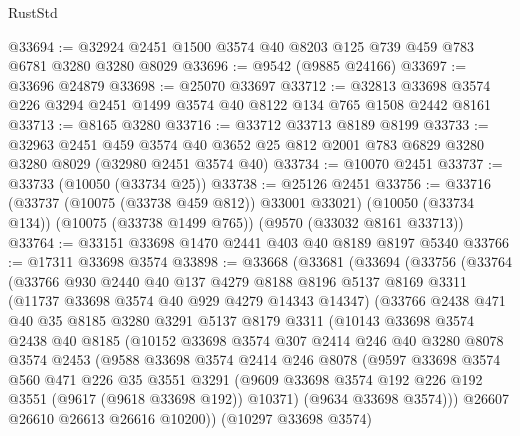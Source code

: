 \begin{lexlean}{RustStd}
\begin{coremodule}
@33694 := @32924 @2451 @1500 @3574 @40 @8203 @125 @739 @459 @783 @6781 @3280 @3280 @8029
@33696 := @9542 (@9885 @24166)
@33697 := @33696 @24879
@33698 := @25070 @33697
@33712 := @32813 @33698 @3574 @226 @3294 @2451 @1499 @3574 @40 @8122 @134 @765 @1508 @2442 @8161
@33713 := @8165 @3280
@33716 := @33712 @33713 @8189 @8199
@33733 := @32963
    @2451
    @459
    @3574
    @40
    @3652
    @25
    @812
    @2001
    @783
    @6829
    @3280
    @3280
    @8029
    (@32980 @2451 @3574 @40)
@33734 := @10070 @2451
@33737 := @33733 (@10050 (@33734 @25))
@33738 := @25126 @2451
@33756 := @33716
    (@33737 (@10075 (@33738 @459 @812)) @33001 @33021)
    (@10050 (@33734 @134))
    (@10075 (@33738 @1499 @765))
    (@9570 (@33032 @8161 @33713))
@33764 := @33151 @33698 @1470 @2441 @403 @40 @8189 @8197 @5340
@33766 := @17311 @33698 @3574
@33898 := @33668
    (@33681
      (@33694
        (@33756
          (@33764
            (@33766
              @930
              @2440
              @40
              @137
              @4279
              @8188
              @8196
              @5137
              @8169
              @3311
              (@11737 @33698 @3574 @40 @929 @4279 @14343 @14347)
              (@33766
                @2438
                @471
                @40
                @35
                @8185
                @3280
                @3291
                @5137
                @8179
                @3311
                (@10143
                  @33698
                  @3574
                  @2438
                  @40
                  @8185
                  (@10152
                    @33698
                    @3574
                    @307
                    @2414
                    @246
                    @40
                    @3280
                    @8078
                    @3574
                    @2453
                    (@9588
                      @33698
                      @3574
                      @2414
                      @246
                      @8078
                      (@9597
                        @33698
                        @3574
                        @560
                        @471
                        @226
                        @35
                        @3551
                        @3291
                        (@9609 @33698 @3574 @192 @226 @192 @3551 (@9617 (@9618 @33698 @192)) @10371)
                        (@9634 @33698 @3574)))
                    @26607
                    @26610
                    @26613
                    @26616
                    @10200))
                (@10297 @33698 @3574)

\end{coremodule}
\end{lexlean}

